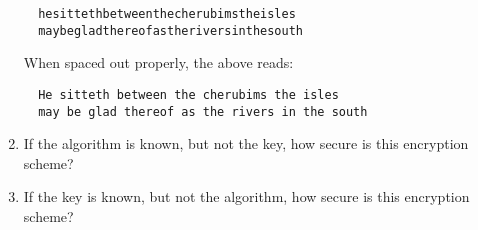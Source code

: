 \begin{problem}
\begin{enumerate}
\begin{Answer}
{\color{crimson}
\begin{verbatim}
  hesittethbetweenthecherubimstheisles
  maybegladthereofastheriversinthesouth
\end{verbatim}
}
\noindent
When spaced out properly, the above reads:
{\color{crimson}
\begin{verbatim}
  He sitteth between the cherubims the isles
  may be glad thereof as the rivers in the south
\end{verbatim}
}

\end{Answer}
\item If the algorithm is known, but not the key, how secure is this
encryption scheme?

\item If the key is known, but not the algorithm, how secure is this
encryption scheme?
\end{enumerate}
\end{problem}
